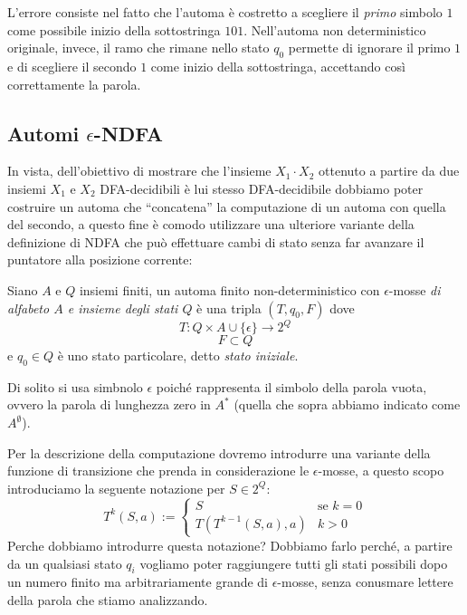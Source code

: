 \begin{exam}
L'errore consiste nel fatto che l'automa è costretto a scegliere il \emph{primo} simbolo \(1\) come possibile inizio della sottostringa \(101\). 
Nell'automa non deterministico originale, invece, il ramo che rimane nello stato \(q_0\) permette di ignorare il primo \(1\) e di scegliere il secondo \(1\) come inizio della sottostringa, accettando così correttamente la parola.
\end{exam}

\subsection{Automi $\epsilon$-NDFA}
In vista, dell'obiettivo di mostrare che l'insieme 
$X_1 \cdot X_2$ 
ottenuto a partire da due insiemi 
$X_1$ e $X_2$ 
DFA-decidibili è lui stesso DFA-decidibile dobbiamo poter costruire un automa 
che ``concatena'' la computazione di un automa con quella del secondo,
a questo fine è comodo utilizzare una ulteriore variante della definizione di 
NDFA che può effettuare cambi di stato senza far avanzare il puntatore alla posizione 
corrente:

\begin{defi}
\label{def:15}
Siano $A$ e $Q$ insiemi finiti, un automa finito non-deterministico con $\epsilon$-mosse \emph{di alfabeto $A$ e insieme degli stati $Q$} è una tripla $(T, q_0, F)$ dove
\[
T : Q \times A \cup \{\epsilon\} \to 2^Q
\]
\[
F \subset Q
\]
e $q_0 \in Q$ è uno stato particolare, detto \emph{stato iniziale}.
\end{defi}

\begin{rema}
    Di solito si usa simbnolo $\epsilon$ poiché rappresenta il simbolo della parola vuota, 
    ovvero la parola di lunghezza zero in $A^*$ (quella che sopra abbiamo indicato come 
    $A^\emptyset$).
\end{rema}

Per la descrizione della computazione dovremo introdurre una variante della funzione di transizione che prenda in considerazione le $\epsilon$-mosse, a questo scopo introduciamo la seguente notazione per $S \in 2^Q$:
\[
T^k(S,a) :=
\begin{cases}
S & \text{se } k = 0 \\
T(T^{k-1}(S,a), a) & k > 0
\end{cases}
\]
Perche dobbiamo introdurre questa notazione? 
Dobbiamo farlo perché, a partire da un qualsiasi stato 
$q_i$ vogliamo poter raggiungere tutti gli stati possibili 
dopo un numero finito ma arbitrariamente grande di $\epsilon$-mosse, senza conusmare lettere della parola che stiamo analizzando.

